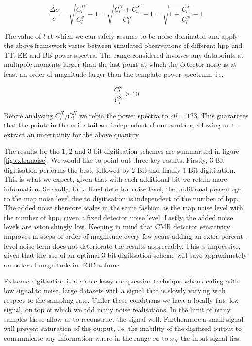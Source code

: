 \documentclass[apj]{emulateapj}
\begin{document}
\[\frac{\Delta \sigma}{\sigma} = \sqrt{\frac{C_l^D}{C_l^{N}}} - 1  = \sqrt{\frac{C_l^N + C_l^X}{C_l^{N}}} - 1 = \sqrt{1 + \frac{C_l^X}{C_l^{N}}} - 1  \]

The value of $l$ at which we can safely assume to be noise dominated and apply the above framework varies between simulated observations of different hpp and TT, EE and BB power spectra. The range considered involves any datapoints at multipole moments larger than the last point at which the detector noise is at least an order of magnitude larger than the template power spectrum, i.e.

\[ \frac{C_l^{\mathrm{N}}}{C_l^{\mathrm{S}}} \geq 10 \]

Before analysing $C_l^X/C_l^N$ we rebin the power spectra to $\Delta l = 123$. This guarantees that the points in the noise tail are independent of one another, allowing us to extract an uncertainty for the above quantity.


The results for the 1, 2 and 3 bit digitisation schemes are summarised in figure \ref{fig:extranoise}. We would like to point out three key results. Firstly, 3 Bit digitisation performs the best, followed by 2 Bit and finally 1 Bit digitisation. This is what we expect, given that with each additional bit we retain more information. Secondly, for a fixed detector noise level, the additional percentage to the map noise level due to digitisation is independent of the number of hpp. The added noise therefore scales in the same fashion as the map noise level with the number of hpp, given a fixed detector noise level. Lastly, the added noise levels are astonishingly low. Keeping in mind that CMB detector sensitivity improves in steps of order of magnitude every few years adding an extra percent-level noise term does not deteriorate the results appreciably. This is impressive, given that the use of an optimal 3 bit digitisation scheme will save approximately an order of magnitude in TOD volume.

Extreme digitisation is a viable lossy compression technique when dealing with low signal to noise, large datasets with a signal that is slowly varying with respect to the sampling rate. Under these conditions we have a locally flat, low signal, on top of which we add many noise realisations. In the limit of many samples these allow us to reconstruct the signal well. Furthermore a small signal will prevent saturation of the output, i.e. the inability of the digitised output to communicate any information where in the range $\infty$ to $x_N$ the input signal lies.
\end{document}
